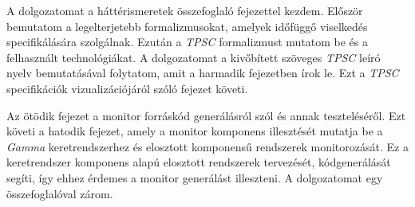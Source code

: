 A dolgozatomat a háttérismeretek összefoglaló fejezettel kezdem.
Először bemutatom a legelterjetebb formalizmusokat, amelyek időfüggő viselkedés specifikálására szolgálnak.
Ezután a \textit{TPSC} formalizmust mutatom be és a felhasznált technológiákat.
A dolgozatomat a kivőbített szöveges \textit{TPSC} leíró nyelv bemutatásával folytatom, amit a harmadik fejezetben írok le.
Ezt a \textit{TPSC} specifikációk vizualizációjáról szóló fejezet követi.

Az ötödik fejezet a monitor forráskód generálásról szól és annak teszteléséről.
Ezt követi a hatodik fejezet, amely a monitor komponens illesztését mutatja be a \textit{Gamma} keretrendszerhez és elosztott komponensű rendszerek monitorozását.
Ez a keretrendszer komponens alapú elosztott rendszerek tervezését, kódgenerálását segíti, így ehhez érdemes a monitor generálást illeszteni.
A dolgozatomat egy összefoglalóval zárom.